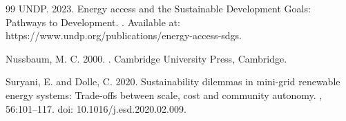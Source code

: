 \documentclass[12pt,a4paper]{article}
\begin{document}
\begin{thebibliography}{99}
UNDP. 2023.
\newblock Energy access and the {S}ustainable {D}evelopment {G}oals: {P}athways to {D}evelopment.
.
\newblock Available at: https://www.undp.org/publications/energy-access-sdgs.

Nussbaum, M. C. 2000.
.
\newblock Cambridge University Press, Cambridge.

Suryani, E. and Dolle, C. 2020.
\newblock Sustainability dilemmas in mini-grid renewable energy systems: {T}rade-offs between scale, cost and community autonomy.
, 56:101--117.
\newblock doi: 10.1016/j.esd.2020.02.009.

\end{thebibliography}
\end{document}

